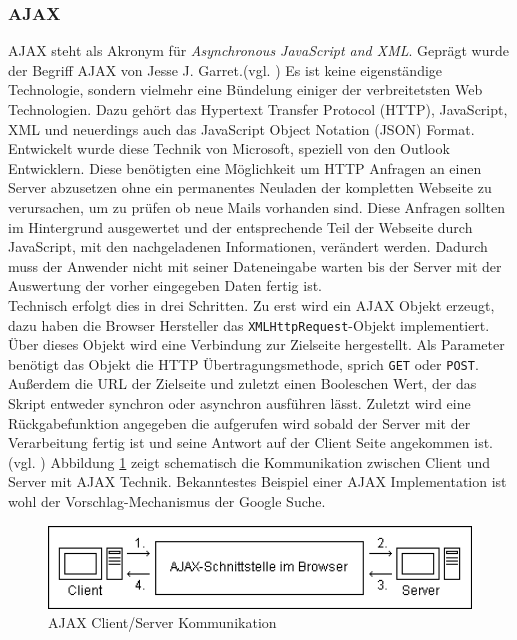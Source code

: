 \subsubsection{AJAX}
AJAX steht als Akronym für \textit{Asynchronous JavaScript and XML}. Geprägt wurde der Begriff AJAX von Jesse J. Garret.(vgl. \cite{JesseJGarret}) Es ist keine eigenständige Technologie, sondern vielmehr eine Bündelung einiger der verbreitetsten Web Technologien. Dazu gehört das Hypertext Transfer Protocol (HTTP), JavaScript, XML und neuerdings auch das JavaScript Object Notation (JSON) Format. Entwickelt wurde diese Technik von Microsoft, speziell von den Outlook Entwicklern. Diese benötigten eine Möglichkeit um HTTP Anfragen an einen Server abzusetzen ohne ein permanentes Neuladen der kompletten Webseite zu verursachen, um zu prüfen ob neue Mails vorhanden sind. Diese Anfragen sollten im Hintergrund ausgewertet und der entsprechende Teil der Webseite durch JavaScript, mit den nachgeladenen Informationen, verändert werden. Dadurch muss der Anwender nicht mit seiner Dateneingabe warten bis der Server mit der Auswertung der vorher eingegeben Daten fertig ist.\\Technisch erfolgt dies in drei Schritten. Zu erst wird ein AJAX Objekt erzeugt, dazu haben die Browser Hersteller das \texttt{XMLHttpRequest}-Objekt implementiert. Über dieses Objekt wird eine Verbindung zur Zielseite hergestellt. Als Parameter benötigt das Objekt die HTTP Übertragungsmethode, sprich \texttt{GET} oder \texttt{POST}. Außerdem die URL der Zielseite und zuletzt einen Booleschen Wert, der das Skript entweder synchron oder asynchron ausführen lässt. Zuletzt wird eine Rückgabefunktion angegeben die aufgerufen wird sobald der Server mit der Verarbeitung fertig ist und seine Antwort auf der Client Seite angekommen ist.(vgl. \cite[S.392ff]{WenzJava2008}) Abbildung \ref{fig:ajax} zeigt schematisch die Kommunikation zwischen Client und Server mit AJAX Technik. Bekanntestes Beispiel einer AJAX Implementation ist wohl der Vorschlag-Mechanismus der Google Suche.

\vspace{1em}
\begin{figure}[htb]
  \centering
  \includegraphics[width=1\textwidth]{abb/ajax_uml}
  \caption[AJAX Client/Server Kommunikation]{AJAX Client/Server Kommunikation \cite{ajax}}
  \label{fig:ajax}
\end{figure}

